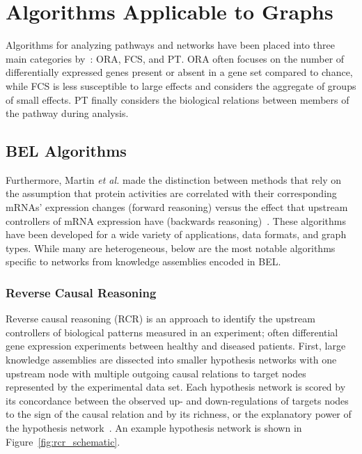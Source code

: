 \section{Algorithms Applicable to Graphs}

Algorithms for analyzing pathways and networks have been placed  into three main categories by~\cite{Khatri2012}: \ac{ORA}, \ac{FCS}, and \ac{PT}.
\ac{ORA} often focuses on the number of differentially expressed genes present or absent in a gene set compared to chance, while \ac{FCS} is less susceptible to large effects and considers the aggregate of groups of small effects.
\ac{PT} finally considers the biological relations between members of the pathway during analysis.

\subsection{BEL Algorithms}

Furthermore, Martin \textit{et al.} made the distinction between methods that rely on the assumption that protein activities are correlated with their corresponding mRNAs' expression changes (forward reasoning) versus the effect that upstream controllers of mRNA expression have (backwards reasoning)~\cite{Martin2014}.
These algorithms have been developed for a wide variety of applications, data formats, and graph types.
While many are heterogeneous, below are the most notable algorithms specific to networks from knowledge assemblies encoded in BEL.

\subsubsection{Reverse Causal Reasoning}

Reverse causal reasoning (\ac{RCR}) is an approach to identify the upstream controllers of biological patterns measured in an experiment; often differential gene expression experiments between healthy and diseased patients.
First, large knowledge assemblies are dissected into smaller hypothesis networks with one upstream node with multiple outgoing causal relations to target nodes represented by the experimental data set.
Each hypothesis network is scored by its concordance between the observed up- and down-regulations of targets nodes to the sign of the causal relation and by its richness, or the explanatory power of the hypothesis network~\cite{Catlett2013}.
An example hypothesis network is shown in Figure~\ref{fig:rcr_schematic}.

